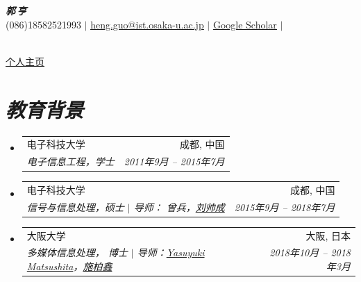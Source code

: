 \documentclass[UTF8]{ctexart}
\makeatletter
\newcommand{\resumeSubheading}[4]{
	\vspace{-2pt}\item
	\begin{tabular*}{0.97\textwidth}[t]{l@{\extracolsep{\fill}}r}
		#1 & #2 \\
		\textit{\small#3} & \textit{\small #4} \\
	\end{tabular*}\vspace{-7pt}
}
\newcommand{\resumeSubHeadingListStart}{\begin{itemize}[leftmargin=0.15in, label={}]}
\newcommand{\resumeSubHeadingListEnd}{\end{itemize}}
\makeatother
\begin{document}
	\begin{minipage}[c]{0.9\textwidth}
	\begin{center}
		\textbf{\Huge \scshape  \textit{郭$\,$亨}} \\ \vspace{14pt}
		(086)18582521993 $|$ \href{mailto:heng.guo@ist.osaka-u.ac.jp}{\underline{heng.guo@ist.osaka-u.ac.jp}} $|$ 
		\href{https://scholar.google.com/citations?user=HKu6gF4AAAAJ&hl=zh-CN}{\underline{Google Scholar}} $|$ 
	\end{center}
	\end{minipage}
	\hspace{-2em}
	\begin{minipage}[r]{0.05\textwidth}
		\centering
		\\
		\vspace{-1em}
		\href{https://gh-home.github.io/}{\underline{个人主页}}
	\end{minipage}

	
	\vspace{-0.5em}
	\section{\textit{\textbf{教育背景}}}
	\resumeSubHeadingListStart
	\resumeSubheading
	{电子科技大学}{成都, 中国}
	{电子信息工程，学士}{\rm  2011年9月 -- 2015年7月}
		\vspace{0.3em}
	\resumeSubheading
	{电子科技大学}{成都, 中国}
	{信号与信息处理，硕士 $|$ 导师： 曾兵，\href{http://www.liushuaicheng.org/}{刘帅成}}{\rm 2015年9月 -- 2018年7月}
		\vspace{0.3em}
	\resumeSubheading
	{大阪大学}{大阪, 日本}
	{多媒体信息处理， 博士 $|$ 导师：\href{http://cvl.ist.osaka-u.ac.jp/en/member/matsushita/}{Yasuyuki Matsushita}，\href{https://cs.pku.edu.cn/info/1073/1888.htm}{施柏鑫}}{\rm  2018年10月 -- 2018年3月}
	\resumeSubHeadingListEnd
	
\end{document}
